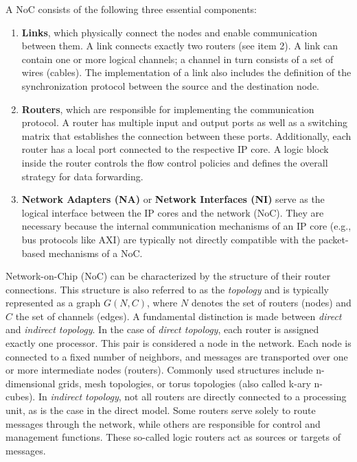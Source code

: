 A NoC consists of the following three essential components:
\begin{enumerate}
    \item \textbf{Links}, which physically connect the nodes and enable communication between them. A link connects exactly two routers (see item 2). A link can contain one or more logical channels; a channel in turn consists of a set of wires (cables). The implementation of a link also includes the definition of the synchronization protocol between the source and the destination node.
    \item \textbf{Routers}, which are responsible for implementing the communication protocol. A router has multiple input and output ports as well as a switching matrix that establishes the connection between these ports. Additionally, each router has a local port connected to the respective IP core. A logic block inside the router controls the flow control policies and defines the overall strategy for data forwarding.
    \item \textbf{Network Adapters (NA)} or \textbf{Network Interfaces (NI)} serve as the logical interface between the IP cores and the network (NoC). They are necessary because the internal communication mechanisms of an IP core (e.g., bus protocols like AXI) are typically not directly compatible with the packet-based mechanisms of a NoC.
\end{enumerate}

Network-on-Chip (NoC) can be characterized by the structure of their router connections. This structure is also referred to as the \textit{topology} and is typically represented as a graph $G(N, C)$, where $N$ denotes the set of routers (nodes) and $C$ the set of channels (edges). A fundamental distinction is made between \textit{direct} and \textit{indirect topology}.
In the case of \textit{direct topology}, each router is assigned exactly one processor. This pair is considered a node in the network. Each node is connected to a fixed number of neighbors, and messages are transported over one or more intermediate nodes (routers). Commonly used structures include n-dimensional grids, mesh topologies, or torus topologies (also called k-ary n-cubes).
In \textit{indirect topology}, not all routers are directly connected to a processing unit, as is the case in the direct model. Some routers serve solely to route messages through the network, while others are responsible for control and management functions. These so-called logic routers act as sources or targets of messages.

